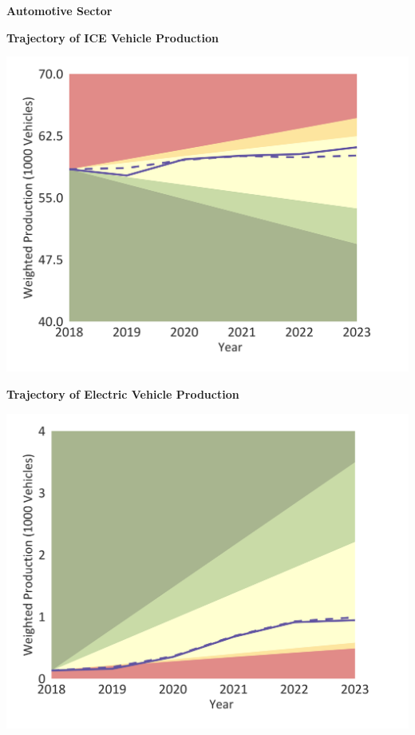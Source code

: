 \documentclass[10pt,table,a4]{article}\usepackage[]{graphicx}\usepackage[]{color}
\begin{document}
	
	\begin{center}
		\textbf{Automotive Sector}
	\end{center}
	
	\begin{minipage}[t]{.49\linewidth}
		\textbf{Trajectory of ICE Vehicle Production}
		
		\includegraphics[trim = {0 0cm 0 0},width=1\linewidth]{CAFigures/Fig14}
		
	\end{minipage}	
	\hspace{.02\linewidth}
	\begin{minipage}[t]{.49\textwidth}
		\textbf{Trajectory of Electric Vehicle Production}
		
		\includegraphics[trim = {0 0cm 0 0},width=1\linewidth]{CAFigures/Fig15}
		
	\end{minipage}		
	
\end{document}
